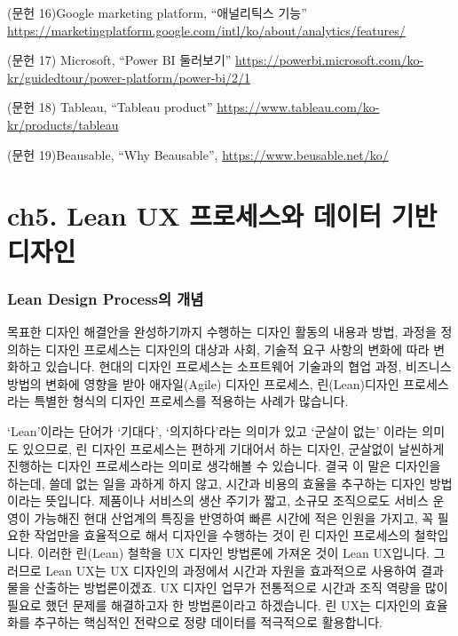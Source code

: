 \documentclass[
  letterpaper,
]{book}
\begin{document}
(문헌 16)Google marketing platform, ``애널리틱스 기능''
\url{https://marketingplatform.google.com/intl/ko/about/analytics/features/}

(문헌 17) Microsoft, ``Power BI 둘러보기''
\url{https://powerbi.microsoft.com/ko-kr/guidedtour/power-platform/power-bi/2/1}

(문헌 18) Tableau, ``Tableau product''
\url{https://www.tableau.com/ko-kr/products/tableau}

(문헌 19)Beausable, ``Why Beausable'',
\url{https://www.beusable.net/ko/}

\chapter{ch5. Lean UX 프로세스와 데이터 기반
디자인}\label{ch5.-lean-ux-uxd504uxb85cuxc138uxc2a4uxc640-uxb370uxc774uxd130-uxae30uxbc18-uxb514uxc790uxc778}

\subsection{Lean Design Process의
개념}\label{lean-design-processuxc758-uxac1cuxb150}

목표한 디자인 해결안을 완성하기까지 수행하는 디자인 활동의 내용과 방법,
과정을 정의하는 디자인 프로세스는 디자인의 대상과 사회, 기술적 요구
사항의 변화에 따라 변화하고 있습니다. 현대의 디자인 프로세스는
소프트웨어 기술과의 협업 과정, 비즈니스 방법의 변화에 영향을 받아
애자일(Agile) 디자인 프로세스, 린(Lean)디자인 프로세스라는 특별한 형식의
디자인 프로세스를 적용하는 사례가 많습니다.

`Lean'이라는 단어가 `기대다', `의지하다'라는 의미가 있고 `군살이 없는'
이라는 의미도 있으므로, 린 디자인 프로세스는 편하게 기대어서 하는
디자인, 군살없이 날씬하게 진행하는 디자인 프로세스라는 의미로 생각해볼
수 있습니다. 결국 이 말은 디자인을 하는데, 쓸데 없는 일을 과하게 하지
않고, 시간과 비용의 효율을 추구하는 디자인 방법이라는 뜻입니다. 제품이나
서비스의 생산 주기가 짧고, 소규모 조직으로도 서비스 운영이 가능해진 현대
산업계의 특징을 반영하여 빠른 시간에 적은 인원을 가지고, 꼭 필요한
작업만을 효율적으로 해서 디자인을 수행하는 것이 린 디자인 프로세스의
철학입니다. 이러한 린(Lean) 철학을 UX 디자인 방법론에 가져온 것이 Lean
UX입니다. 그러므로 Lean UX는 UX 디자인의 과정에서 시간과 자원을
효과적으로 사용하여 결과물을 산출하는 방법론이겠죠. UX 디자인 업무가
전통적으로 시간과 조직 역량을 많이 필요로 했던 문제를 해결하고자 한
방법론이라고 하겠습니다. 린 UX는 디자인의 효율화를 추구하는 핵심적인
전략으로 정량 데이터를 적극적으로 활용합니다.
\end{document}
